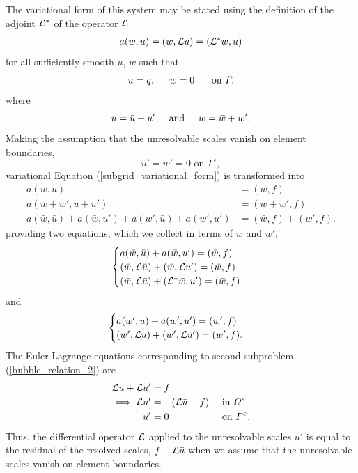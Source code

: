 The variational form of this system may be stated using the definition of the   adjoint $\Lu^*$ of the operator $\Lu$
\begin{align}
  \label{subgrid_variational_form}
  a(w,u) = (w, \Lu u) = (\Lu^* w, u)
\end{align}
for all sufficiently smooth $u$, $w$ such that
$$u = q, \hspace{5mm} w = 0 \hspace{5mm} \text{ on } \Gamma,$$
where
\begin{align*}
  u = \bar{u} + u'  \hspace{5mm} \text{and} \hspace{5mm}
  w = \bar{w} + w'.
\end{align*}
Making the assumption that the unresolvable scales vanish on element boundaries,
$$u' = w' = 0 \text{ on } \Gamma',$$
variational Equation (\ref{subgrid_variational_form}) is transformed into
\begin{align*}
  a(w,u) &= (w,f) \\
  a(\bar{w} + w', \bar{u} + u') &= (\bar{w} + w', f) \\
  a(\bar{w}, \bar{u}) + a(\bar{w}, u') + a(w', \bar{u}) + a(w',u')  &= (\bar{w}, f) + (w',f).
\end{align*}
providing two equations, which we collect in terms of $\bar{w}$ and $w'$,
\begin{align}
  \label{bubble_relation_1}
  \begin{cases}
    a(\bar{w}, \bar{u}) + a(\bar{w}, u') = (\bar{w}, f) \\
    (\bar{w}, \Lu \bar{u}) + (\bar{w}, \Lu u') = (\bar{w}, f) \\
    (\bar{w}, \Lu \bar{u}) + (\Lu^* \bar{w}, u') = (\bar{w}, f)
  \end{cases}
\end{align}
and
\begin{align}
  \label{bubble_relation_2}
  \begin{cases}
    a(w', \bar{u}) + a(w',u')  = (w',f) \\
    (w', \Lu \bar{u}) + (w', \Lu u')  = (w',f).
  \end{cases}
\end{align}
The Euler-Lagrange equations corresponding to second subproblem (\ref{bubble_relation_2}) are
\begin{align}
  \Lu \bar{u} + \Lu u' &= f && \notag \\
  \label{bubble_euler_lagrange}
  \implies \Lu u' &= - (\Lu\bar{u} - f) &&\text{ in } \Omega^e \\
               u' &= 0 &&\text{ on } \Gamma^e. \notag
\end{align}
Thus, the differential operator $\Lu$ applied to the unresolvable scales $u'$ is equal to the residual of the resolved scales, $f - \Lu \bar{u}$ when we assume that the unresolvable scales vanish on element boundaries.

